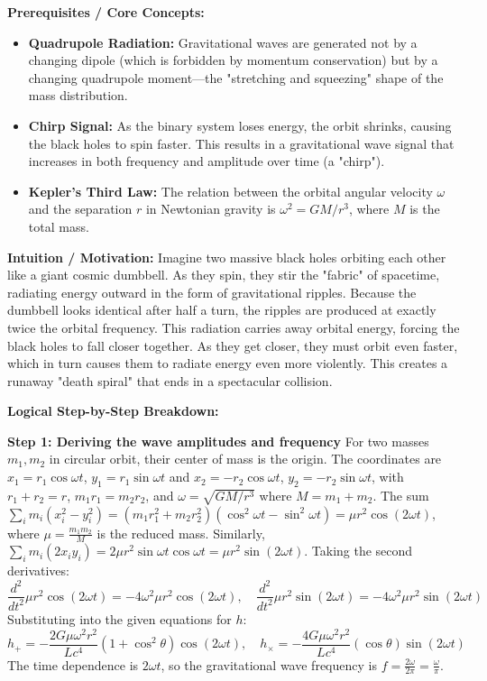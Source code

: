 \begin{solution}
\textbf{Prerequisites / Core Concepts:}
\begin{itemize}
    \item \textbf{Quadrupole Radiation:} Gravitational waves are generated not by a changing dipole (which is forbidden by momentum conservation) but by a changing quadrupole moment—the "stretching and squeezing" shape of the mass distribution.
    \item \textbf{Chirp Signal:} As the binary system loses energy, the orbit shrinks, causing the black holes to spin faster. This results in a gravitational wave signal that increases in both frequency and amplitude over time (a "chirp").
    \item \textbf{Kepler's Third Law:} The relation between the orbital angular velocity $\omega$ and the separation $r$ in Newtonian gravity is $\omega^2 = GM/r^3$, where $M$ is the total mass.
\end{itemize}

\textbf{Intuition / Motivation:}
Imagine two massive black holes orbiting each other like a giant cosmic dumbbell. As they spin, they stir the "fabric" of spacetime, radiating energy outward in the form of gravitational ripples. Because the dumbbell looks identical after half a turn, the ripples are produced at exactly twice the orbital frequency. This radiation carries away orbital energy, forcing the black holes to fall closer together. As they get closer, they must orbit even faster, which in turn causes them to radiate energy even more violently. This creates a runaway "death spiral" that ends in a spectacular collision.

\textbf{Logical Step-by-Step Breakdown:}

\textbf{Step 1: Deriving the wave amplitudes and frequency}
For two masses $m_1, m_2$ in circular orbit, their center of mass is the origin. The coordinates are $x_1 = r_1 \cos\omega t$, $y_1 = r_1 \sin\omega t$ and $x_2 = -r_2 \cos\omega t$, $y_2 = -r_2 \sin\omega t$, with $r_1+r_2=r$, $m_1 r_1 = m_2 r_2$, and $\omega = \sqrt{GM/r^3}$ where $M = m_1+m_2$.
The sum $\sum_i m_i (x_i^2 - y_i^2) = (m_1 r_1^2 + m_2 r_2^2) (\cos^2\omega t - \sin^2\omega t) = \mu r^2 \cos(2\omega t)$, where $\mu = \frac{m_1 m_2}{M}$ is the reduced mass.
Similarly, $\sum_i m_i (2 x_i y_i) = 2 \mu r^2 \sin\omega t \cos\omega t = \mu r^2 \sin(2\omega t)$.
Taking the second derivatives:
\[ \frac{d^2}{dt^2} \mu r^2 \cos(2\omega t) = -4\omega^2 \mu r^2 \cos(2\omega t), \quad \frac{d^2}{dt^2} \mu r^2 \sin(2\omega t) = -4\omega^2 \mu r^2 \sin(2\omega t) \]
Substituting into the given equations for $h$:
\[ h_+ = -\frac{2G\mu\omega^2 r^2}{L c^4} (1 + \cos^2\theta) \cos(2\omega t), \quad h_\times = -\frac{4G\mu\omega^2 r^2}{L c^4} (\cos\theta) \sin(2\omega t) \]
The time dependence is $2\omega t$, so the gravitational wave frequency is $f = \frac{2\omega}{2\pi} = \frac{\omega}{\pi}$.


\end{solution}
